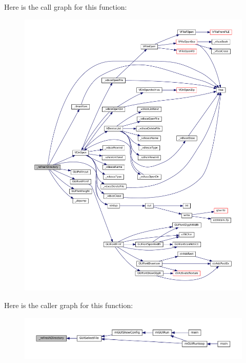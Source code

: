 Here is the call graph for this function\+:
\nopagebreak
\begin{figure}[H]
\begin{center}
\leavevmode
\includegraphics[width=350pt]{file-select_8c_ad8e0bb9d5b8355bc27bdc9a55dcc2e75_cgraph}
\end{center}
\end{figure}
Here is the caller graph for this function\+:
\nopagebreak
\begin{figure}[H]
\begin{center}
\leavevmode
\includegraphics[width=350pt]{file-select_8c_ad8e0bb9d5b8355bc27bdc9a55dcc2e75_icgraph}
\end{center}
\end{figure}
\mbox{\label{file-select_8c_aac23dd0c263192be4391a136d2d31d9a}} 
